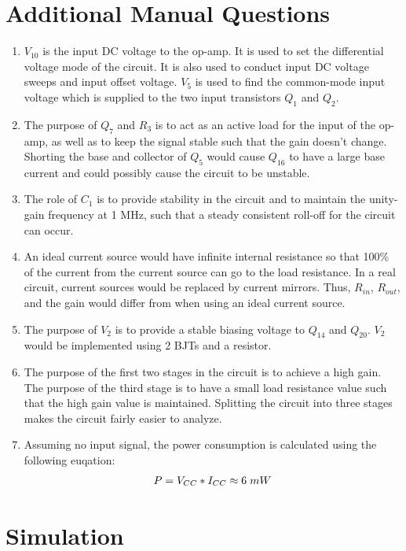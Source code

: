 \documentclass{article}
\begin{document}
	\pagebreak
	\section{Additional Manual Questions}
	\begin{enumerate}
		\item $V_{10}$ is the input DC voltage to the op-amp.
		It is used to set the differential voltage mode of the circuit.
		It is also used to conduct input DC voltage sweeps and input offset voltage.
		$V_5$ is used to find the common-mode input voltage which is supplied to the two input transistors $Q_1$ and $Q_2$.
		\item The purpose of $Q_7$ and $R_3$ is to act as an active load for the input of the op-amp, as well as to keep the signal stable such that the gain doesn’t change.
		Shorting the base and collector of $Q_5$ would cause $Q_{16}$ to have a large base current and could possibly cause the circuit to be unstable.
		\item The role of $C_1$ is to provide stability in the circuit and to maintain the unity-gain frequency at 1 MHz, such that a steady consistent roll-off for the circuit can occur.
		\item An ideal current source would have infinite internal resistance so that 100\% of the current from the current source can go to the load resistance.
		In a real circuit, current sources would be replaced by current mirrors.
		Thus, $R_{in}$, $R_{out}$, and the gain would differ from when using an ideal current source.
		\item The purpose of $V_2$ is to provide a stable biasing voltage to $Q_{14}$ and $Q_{20}$.
		$V_2$ would be implemented using 2 BJTs and a resistor.
		\item The purpose of the first two stages in the circuit is to achieve a high gain.
		The purpose of the third stage is to have a small load resistance value such that the high gain value is maintained.
		Splitting the circuit into three stages makes the circuit fairly easier to analyze.
		\item Assuming no input signal, the power consumption is calculated using the following euqation:
		\begin{align*}
			P = V_{CC} * I_{CC} \approx 6 \hspace{1mm} mW
		\end{align*}
	\end{enumerate}

	\pagebreak
	\section{Simulation}
\end{document}
